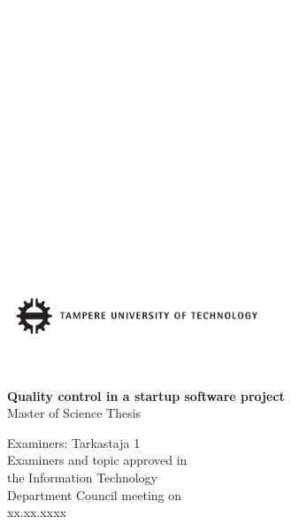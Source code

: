  
\thispagestyle{empty}
 
\vspace*{-.5cm}\noindent
 
 
\includegraphics[width=8cm]{assets/tut-logo}
 
\vspace{6.8cm}
 
\\
{\bf\large \textsf{Quality control in a startup software project}}\\
\textsf{Master of Science Thesis}
 
\vspace{8.7cm} %
 
\begin{flushright}
  
\begin{minipage}[c]{6.8cm}
\begin{spacing}{1.0}
\textsf{Examiners: Tarkastaja 1}\\
\textsf{Examiners and topic approved in}\\ 
\textsf{the Information Technology}\\
\textsf{Department Council meeting on}\\
\textsf{xx.xx.xxxx}\\
\end{spacing}
\end{minipage}
\end{flushright}
 
